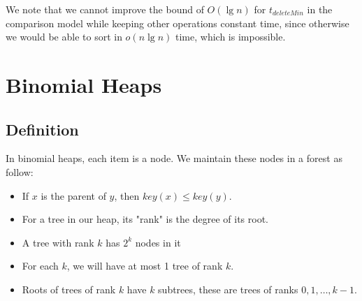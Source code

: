 \documentclass[11pt]{article}
\begin{document}
We note that we cannot improve the bound of $O(\lg n)$ for $t_{deleteMin}$ in the comparison model while keeping other operations constant time, since otherwise we would be able to sort in $o(n \lg n)$ time, which is impossible.

\section{Binomial Heaps}

\subsection{Definition}
In binomial heaps, each item is a node. We maintain these nodes in a forest as follow:

\begin{itemize}
\item If $x$ is the parent of $y$, then $key(x) \leq key(y)$.
\item For a tree in our heap, its "rank" is the degree of its root.
\item A tree with rank $k$ has $2^k$ nodes in it
\item For each $k$, we will have at most 1 tree of rank $k$.
\item Roots of trees of rank $k$ have $k$ subtrees, these are trees of ranks $0,1,\dots, k-1$.
\end{itemize}
\end{document}
